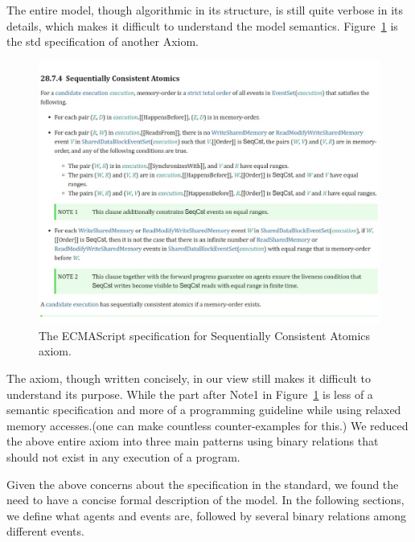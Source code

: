     The entire model, though algorithmic in its structure, is still quite verbose in its details, which makes it difficult to understand the model semantics. 
    Figure~\ref{model:Std3} is the std specification of another Axiom. 
    \begin{figure}[H]
        \centering 
        \includegraphics[scale=0.6]{3.ECMAScriptMemoryModel/ECMAScriptStdSeqCnsAt.pdf}
        \caption{The ECMAScript specification for Sequentially Consistent Atomics axiom.}
        \label{model:Std3}
    \end{figure}
    The axiom, though written concisely, in our view still makes it difficult to understand its purpose. 
    While the part after Note1 in Figure~\ref{model:Std3} is less of a semantic specification and more of a programming guideline while using 
    relaxed memory accesses.(one can make countless counter-examples for this.) 
    We reduced the above entire axiom into three main patterns using binary relations that should not exist in any execution of a program. 

Given the above concerns about the specification in the standard, we found the need to have a concise formal description of the model. 
In the following sections, we define what agents and events are, followed by several binary relations among different events.
